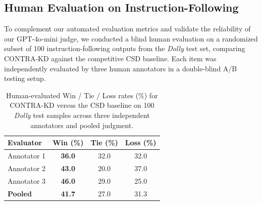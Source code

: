 \documentclass{article} %
\theoremstyle{definition}
\theoremstyle{remark}
\begin{document}



\subsection{Human Evaluation on Instruction-Following}
\label{sec:appendix_human_eval}

To complement our automated evaluation metrics and validate the reliability of our GPT-4o-mini judge, we conducted a blind human evaluation on a randomized subset of 100 instruction-following outputs from the \textit{Dolly} test set, comparing CONTRA-KD against the competitive CSD baseline. Each item was independently evaluated by three human annotators in a double-blind A/B testing setup.

\begin{table}[htbp]
\centering
\small
\setlength{\tabcolsep}{14pt}
\caption{Human-evaluated Win / Tie / Loss rates (\%) for CONTRA-KD versus the CSD baseline on 100 \textit{Dolly} test samples across three independent annotators and pooled judgment.}
\label{tab:human_eval}
\begin{tabular}{lccc}
\toprule
\textbf{Evaluator} & \textbf{Win (\%)} & \textbf{Tie (\%)} & \textbf{Loss (\%)} \\
\midrule
Annotator 1 & \textbf{36.0} & 32.0 & 32.0 \\
Annotator 2 & \textbf{43.0} & 20.0 & 37.0 \\
Annotator 3 & \textbf{46.0} & 29.0 & 25.0 \\
\midrule
\textbf{Pooled} & \textbf{41.7} & 27.0 & 31.3 \\
\bottomrule
\end{tabular}
\end{table}
\end{document}
